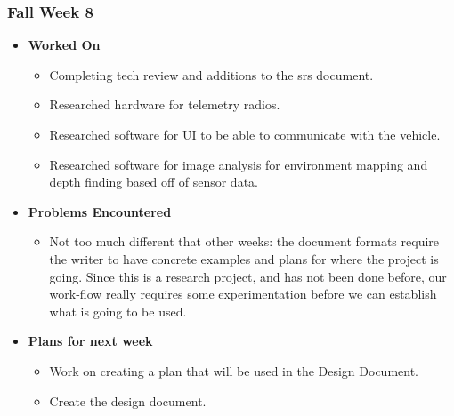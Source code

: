 \documentclass{article}
\begin{document}
\subsubsection{Fall Week 8}
\begin{itemize}
    \item {\textbf{Worked On}}
    \begin{itemize}
        \item Completing tech review and additions to the srs document.
        \item Researched hardware for telemetry radios.
        \item Researched software for UI to be able to communicate with the vehicle.
        \item Researched software for image analysis for environment mapping and depth finding based off of sensor data.
    \end{itemize}

    \item {\textbf{Problems Encountered}}
    \begin{itemize}
        \item Not too much different that other weeks: the document formats require the writer to have concrete examples and plans for where the project is going. Since this is a research project, and has not been done before, our work-flow really requires some experimentation before we can establish what is going to be used.
    \end{itemize}

    \item{\textbf{Plans for next week}}
    \begin{itemize}
        \item Work on creating a plan that will be used in the Design Document.
        \item Create the design document.
    \end{itemize}
\end{itemize}
\end{document}
